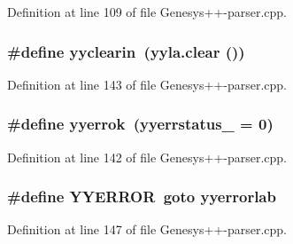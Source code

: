 Definition at line 109 of file Genesys++-\/parser.\-cpp.

\hypertarget{_genesys_09_09-parser_8cpp_a5035d59933b3f5388c44f596145db047}{
\subsubsection[{yyclearin}]{\setlength{\rightskip}{0pt plus 5cm}\#define yyclearin~(yyla.\-clear ())}}\label{_genesys_09_09-parser_8cpp_a5035d59933b3f5388c44f596145db047}


Definition at line 143 of file Genesys++-\/parser.\-cpp.

\hypertarget{_genesys_09_09-parser_8cpp_a20bf055e53dc4fd5afddfd752a4d1adb}{
\subsubsection[{yyerrok}]{\setlength{\rightskip}{0pt plus 5cm}\#define yyerrok~(yyerrstatus\-\_\- = 0)}}\label{_genesys_09_09-parser_8cpp_a20bf055e53dc4fd5afddfd752a4d1adb}


Definition at line 142 of file Genesys++-\/parser.\-cpp.

\hypertarget{_genesys_09_09-parser_8cpp_af1eef6197be78122699013d0784acc80}{
\subsubsection[{Y\-Y\-E\-R\-R\-O\-R}]{\setlength{\rightskip}{0pt plus 5cm}\#define Y\-Y\-E\-R\-R\-O\-R~goto yyerrorlab}}\label{_genesys_09_09-parser_8cpp_af1eef6197be78122699013d0784acc80}


Definition at line 147 of file Genesys++-\/parser.\-cpp.

